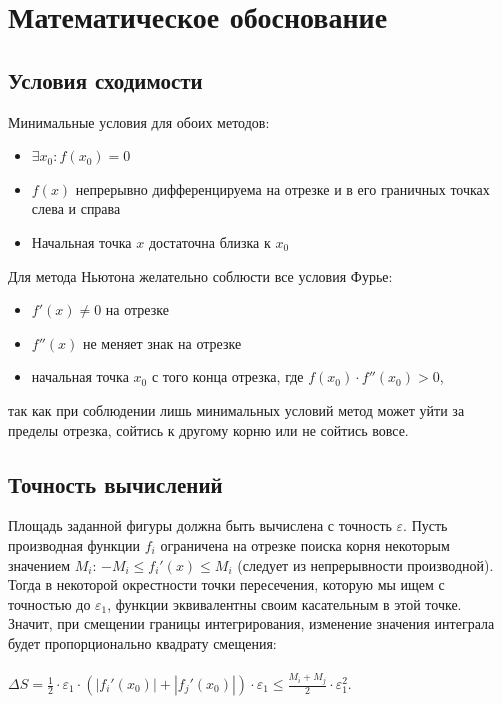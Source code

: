 \documentclass[a4paper,12pt,titlepage,finall]{article}
\begin{document}
\newpage

\section{Математическое обоснование}

\subsection{Условия сходимости}
Минимальные условия для обоих методов:
\begin{itemize}
    \item $\exists x_0: f(x_0) = 0$
    \item $f(x)$ непрерывно дифференцируема на отрезке и в его граничных точках слева и справа
    \item Начальная точка $x$ достаточна близка к $x_0$
\end{itemize}

Для метода Ньютона желательно соблюсти все условия Фурье:
\begin{itemize}
    \item $f'(x) \neq 0$ на отрезке
    \item $f''(x)$ не меняет знак на отрезке
    \item начальная точка $x_0$ с того конца отрезка, где $f(x_0)\cdot f''(x_0) > 0$,
\end{itemize}
так как при соблюдении лишь минимальных условий метод может уйти за пределы отрезка, сойтись к другому корню или не сойтись вовсе.~\cite{math}\\

\newpage

\subsection{Точность вычислений}

Площадь заданной фигуры должна быть вычислена с точность $\varepsilon$. Пусть производная функции $f_i$ ограничена на отрезке поиска корня некоторым значением $M_i$: $-M_i \leq f_i'(x) \leq M_i$ (следует из непрерывности производной). Тогда в некоторой окрестности точки пересечения, которую мы ищем с точностью до $\varepsilon_1$, функции эквивалентны своим касательным в этой точке.~\cite{math} Значит, при смещении границы интегрирования, изменение значения интеграла будет пропорционально квадрату смещения:\\\\
$\Delta S = \frac{1}{2} \cdot \varepsilon_1 \cdot (|f_i'(x_0)| + |f_j'(x_0)|) \cdot \varepsilon_1 \leq \frac{M_i + M_j}{2} \cdot \varepsilon_1^2$.\\
\end{document}
